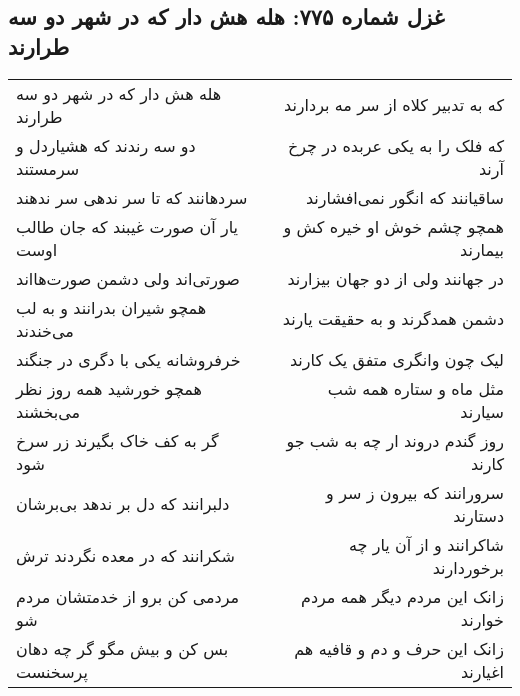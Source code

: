 \begin{center}
\section*{غزل شماره ۷۷۵: هله هش دار که در شهر دو سه طرارند}
\label{sec:0775}
\begin{longtable}{l p{0.5cm} r}
هله هش دار که در شهر دو سه طرارند
&&
که به تدبیر کلاه از سر مه بردارند
\\
دو سه رندند که هشیاردل و سرمستند
&&
که فلک را به یکی عربده در چرخ آرند
\\
سردهانند که تا سر ندهی سر ندهند
&&
ساقیانند که انگور نمی‌افشارند
\\
یار آن صورت غیبند که جان طالب اوست
&&
همچو چشم خوش او خیره کش و بیمارند
\\
صورتی‌اند ولی دشمن صورت‌هااند
&&
در جهانند ولی از دو جهان بیزارند
\\
همچو شیران بدرانند و به لب می‌خندند
&&
دشمن همدگرند و به حقیقت یارند
\\
خرفروشانه یکی با دگری در جنگند
&&
لیک چون وانگری متفق یک کارند
\\
همچو خورشید همه روز نظر می‌بخشند
&&
مثل ماه و ستاره همه شب سیارند
\\
گر به کف خاک بگیرند زر سرخ شود
&&
روز گندم دروند ار چه به شب جو کارند
\\
دلبرانند که دل بر ندهد بی‌برشان
&&
سرورانند که بیرون ز سر و دستارند
\\
شکرانند که در معده نگردند ترش
&&
شاکرانند و از آن یار چه برخوردارند
\\
مردمی کن برو از خدمتشان مردم شو
&&
زانک این مردم دیگر همه مردم خوارند
\\
بس کن و بیش مگو گر چه دهان پرسخنست
&&
زانک این حرف و دم و قافیه هم اغیارند
\\
\end{longtable}
\end{center}
